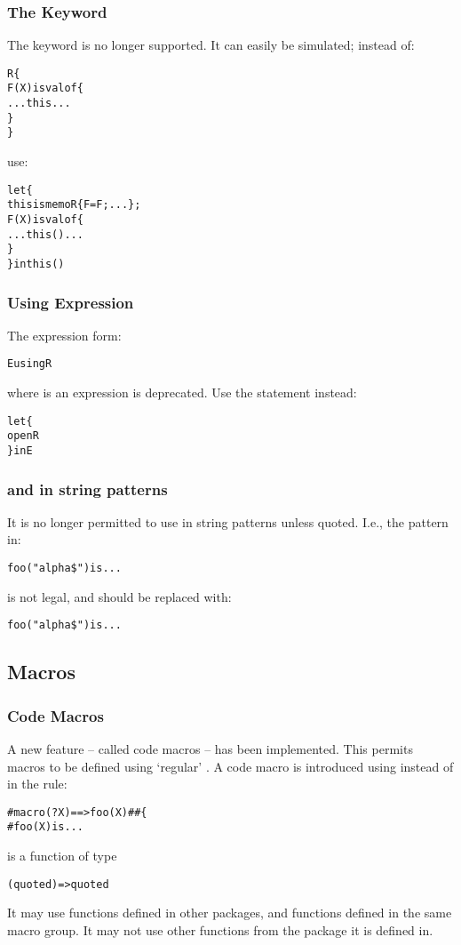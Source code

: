\subsubsection{The  Keyword}
The  keyword is no longer supported. It can easily be simulated; instead of:
\begin{alltt}
R\{
  F(X) is valof\{
    ... this ...
  \}
\}
\end{alltt}
use:
\begin{alltt}
let\{
  this is memo R\{F=F;...\};
  F(X) is valof\{
    ... this() ...
  \}
\} in this()
\end{alltt}

\subsubsection{Using Expression}
The expression form:
\begin{alltt}
E using R
\end{alltt}
where  is an expression is deprecated. Use the  statement instead:
\begin{alltt}
let\{
  open R
\} in E
\end{alltt}

\subsubsection{\q{\$} and \q{\#} in string patterns}
It is no longer permitted to use in string patterns unless quoted. I.e., the pattern in:
\begin{alltt}
foo("alpha\$") is ...
\end{alltt}
is not legal, and should be replaced with:
\begin{alltt}
foo("alpha\bsl\$") is ...
\end{alltt}

\subsection{Macros}

\subsubsection{Code Macros}
A new feature -- called code macros -- has been implemented. This permits macros to be defined using `regular' \Sr. A code macro is introduced using  instead of \q{==>} in the rule:
\begin{alltt}
#macro(?X) ==> foo(X) \#\# \{
  #foo(X) is ...
\end{alltt}
 is a function of type 
\begin{alltt}
(quoted)=>quoted
\end{alltt}
It may use functions defined in other packages, and functions defined in the same macro group. It may not use other functions from the package it is defined in.

